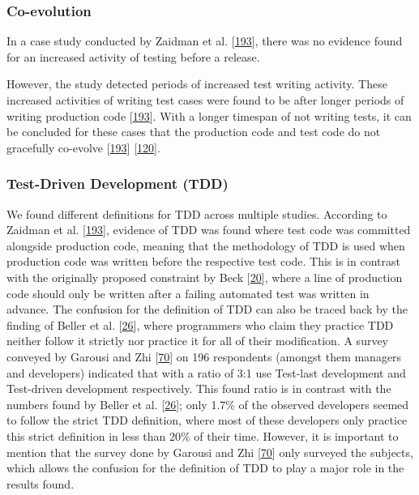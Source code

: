 \documentclass[]{book}
\begin{document}
\subsubsection{Co-evolution}\label{co-evolution}

In a case study conducted by Zaidman et al.
{[}\protect\hyperlink{ref-zaidman2011studying}{193}{]}, there was no
evidence found for an increased activity of testing before a release.

However, the study detected periods of increased test writing activity.
These increased activities of writing test cases were found to be after
longer periods of writing production code
{[}\protect\hyperlink{ref-zaidman2011studying}{193}{]}. With a longer
timespan of not writing tests, it can be concluded for these cases that
the production code and test code do not gracefully co-evolve
{[}\protect\hyperlink{ref-zaidman2011studying}{193}{]}
{[}\protect\hyperlink{ref-marsavina2014}{120}{]}.

\subsubsection{Test-Driven Development
(TDD)}\label{test-driven-development-tdd}

We found different definitions for TDD across multiple studies.
According to Zaidman et al.
{[}\protect\hyperlink{ref-zaidman2011studying}{193}{]}, evidence of TDD
was found where test code was committed alongside production code,
meaning that the methodology of TDD is used when production code was
written before the respective test code. This is in contrast with the
originally proposed constraint by Beck
{[}\protect\hyperlink{ref-beck2003test}{20}{]}, where a line of
production code should only be written after a failing automated test
was written in advance. The confusion for the definition of TDD can also
be traced back by the finding of Beller et al.
{[}\protect\hyperlink{ref-beller2015}{26}{]}, where programmers who
claim they practice TDD neither follow it strictly nor practice it for
all of their modification. A survey conveyed by Garousi and Zhi
{[}\protect\hyperlink{ref-GAROUSI20131354}{70}{]} on 196 respondents
(amongst them managers and developers) indicated that with a ratio of
3:1 use Test-last development and Test-driven development respectively.
This found ratio is in contrast with the numbers found by Beller et al.
{[}\protect\hyperlink{ref-beller2015}{26}{]}; only 1.7\% of the observed
developers seemed to follow the strict TDD definition, where most of
these developers only practice this strict definition in less than 20\%
of their time. However, it is important to mention that the survey done
by Garousi and Zhi {[}\protect\hyperlink{ref-GAROUSI20131354}{70}{]}
only surveyed the subjects, which allows the confusion for the
definition of TDD to play a major role in the results found.
\end{document}
